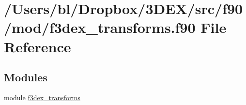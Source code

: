 \hypertarget{f3dex__transforms_8f90}{
\section{/Users/bl/Dropbox/3DEX/src/f90/mod/f3dex\_\-transforms.f90 File Reference}
\label{f3dex__transforms_8f90}
}
\subsection*{Modules}
\begin{DoxyCompactItemize}
\item 
module \hyperlink{namespacef3dex__transforms}{f3dex\_\-transforms}
\end{DoxyCompactItemize}
